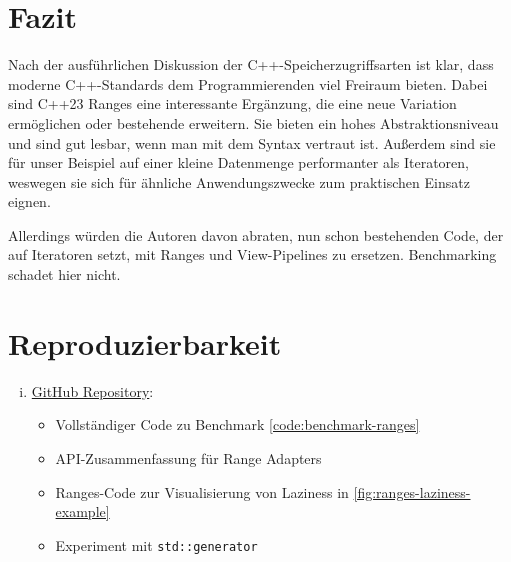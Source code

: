 \documentclass[runningheads]{llncs}
\begin{document}
\section{Fazit}

Nach der ausführlichen Diskussion der C++-Speicherzugriffsarten ist klar, dass moderne C++-Standards dem Programmierenden viel Freiraum bieten.
Dabei sind C++23 Ranges eine interessante Ergänzung, die eine neue Variation ermöglichen oder bestehende erweitern.
Sie bieten ein hohes Abstraktionsniveau und sind gut lesbar, wenn man mit dem Syntax vertraut ist.
Außerdem sind sie für unser Beispiel auf einer kleine Datenmenge performanter als Iteratoren, weswegen sie sich für ähnliche Anwendungszwecke zum praktischen Einsatz eignen.

Allerdings würden die Autoren davon abraten, nun schon bestehenden Code, der auf Iteratoren setzt, mit Ranges und View-Pipelines zu ersetzen.
Benchmarking schadet hier nicht.


\section*{Reproduzierbarkeit}

\begin{enumerate}[i.]
	\item \href{https://github.com/becknik/SeminarModernCpp}{GitHub Repository}:
	      \begin{itemize}
		      \item Vollständiger Code zu Benchmark \ref{code:benchmark-ranges}
		      \item API-Zusammenfassung für Range Adapters
		      \item Ranges-Code zur Visualisierung von Laziness in \autoref{fig:ranges-laziness-example}
		      \item Experiment mit \texttt{std::generator}
	      \end{itemize}
\end{enumerate}

\newpage
\printbibliography
\end{document}

